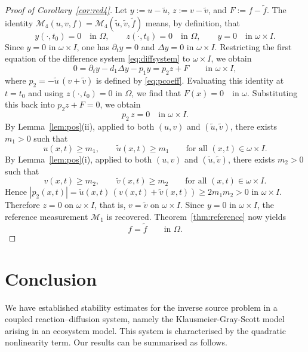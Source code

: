 \documentclass[12pt]{amsart}
\theoremstyle{plain}
\theoremstyle{definition}
\theoremstyle{remark}
\begin{document}
\begin{proof}[Proof of Corollary~\ref{cor:red4}]
Let $y:=u-\widetilde u$, $z:=v-\widetilde v$, and $F:=f-\widetilde f$.
The identity $\mathcal{M}_4(u,v,f)=\mathcal{M}_4(\widetilde u,
\widetilde v,\widetilde f)$
means, by definition, that
\[
y(\cdot,t_0)=0 \quad\text{in }\Omega, \qquad
z(\cdot,t_0)=0 \quad\text{in }\Omega, \qquad
y=0 \quad\text{in }\omega\times I.
\]
Since $y=0$ in $\omega\times I$, one has
$\partial_t y=0$ and $\Delta y=0$ in $\omega\times I$.
Restricting the first equation of the difference system \eqref{eq:diffsystem} to \(\omega\times I\), we obtain
\[
0=\partial_t y-d_1\Delta y-p_1y=p_2z+F
\qquad \text{in } \omega\times I,
\]
where $p_2=-\widetilde u\,(v+\widetilde v)$ is defined by \eqref{eq:pcoeff}.
Evaluating this identity at \(t=t_0\) and using \(z(\cdot,t_0)=0\) 
in \(\Omega\),
we find that $ F(x)=0 \quad \text{in } \omega.$
Substituting this back into \(p_2z+F=0\), we obtain \[ p_2\,z=0 \quad 
\text{in } \omega\times I.\]
By Lemma~\ref{lem:pos}(ii), applied to both $(u,v)$ and 
$(\widetilde u,\widetilde v)$,
there exists \(m_1>0\) such that
\[
u(x,t)\ge m_1,
\qquad
\widetilde u(x,t)\ge m_1
\qquad \text{for all } (x,t)\in \omega\times I.
\]
By Lemma~\ref{lem:pos}(i), applied to both $(u,v)$ and 
$(\widetilde u,\widetilde v)$,
there exists \(m_2>0\) such that
\[
v(x,t)\ge m_2,
\qquad
\widetilde v(x,t)\ge m_2
\qquad \text{for all } (x,t)\in \omega\times I.
\]
Hence $|p_2(x,t)|
= \widetilde u(x,t)\,(v(x,t)+\widetilde v(x,t))
\ge 2m_1m_2>0$ in $\omega\times I$.
Therefore \(z=0\) on \(\omega\times I\), that is,
$v=\widetilde v$ on $\omega\times I$.
Since \(y=0\) in \(\omega\times I\), the reference measurement \(\mathcal M_1\)
is recovered.
Theorem~\ref{thm:reference} now yields
\[
f=\widetilde f
\qquad \text{in } \Omega.
\]
\end{proof}





\section{Conclusion}\label{sec:conclusion}

We have established stability estimates for the inverse source problem in a coupled reaction--diffusion system, namely the Klausmeier-Gray-Scott model arising in an ecosystem model. This system is characterised by the quadratic nonlinearity term. Our results can be summarised as follows.
\end{document}
